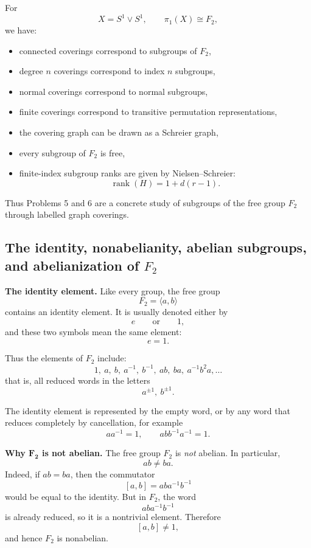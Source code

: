 \documentclass[12pt,a4paper]{article}
\theoremstyle{notespace}
\begin{document}
For
\[
X=S^1\vee S^1,
\qquad
\pi_1(X)\cong F_2,
\]
we have:
\begin{itemize}
	\item connected coverings correspond to subgroups of \(F_2\),
	\item degree \(n\) coverings correspond to index \(n\) subgroups,
	\item normal coverings correspond to normal subgroups,
	\item finite coverings correspond to transitive permutation representations,
	\item the covering graph can be drawn as a Schreier graph,
	\item every subgroup of \(F_2\) is free,
	\item finite-index subgroup ranks are given by Nielsen--Schreier:
	\[
	\operatorname{rank}(H)=1+d(r-1).
	\]
\end{itemize}

Thus Problems 5 and 6 are a concrete study of subgroups of the free group \(F_2\) through labelled graph coverings.

\subsection{The identity, nonabelianity, abelian subgroups, and abelianization of \texorpdfstring{$F_2$}{F2}}

\textbf{The identity element.}
Like every group, the free group
\[
F_2=\langle a,b\rangle
\]
contains an identity element. It is usually denoted either by
\[
e
\qquad\text{or}\qquad
1,
\]
and these two symbols mean the same element:
\[
e=1.
\]

Thus the elements of \(F_2\) include:
\[
1,\ a,\ b,\ a^{-1},\ b^{-1},\ ab,\ ba,\ a^{-1}b^2a,\dots
\]
that is, all reduced words in the letters
\[
a^{\pm 1},\ b^{\pm 1}.
\]

The identity element is represented by the empty word, or by any word that reduces completely by cancellation, for example
\[
aa^{-1}=1,
\qquad
abb^{-1}a^{-1}=1.
\]

\bigskip

\textbf{Why \(\boldsymbol{F_2}\) is not abelian.}
The free group \(F_2\) is \emph{not} abelian. In particular,
\[
ab\neq ba.
\]
Indeed, if \(ab=ba\), then the commutator
\[
[a,b]=aba^{-1}b^{-1}
\]
would be equal to the identity. But in \(F_2\), the word
\[
aba^{-1}b^{-1}
\]
is already reduced, so it is a nontrivial element. Therefore
\[
[a,b]\neq 1,
\]
and hence \(F_2\) is nonabelian.
\end{document}
